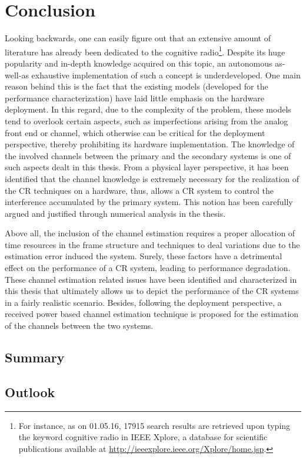 \chapter{Conclusion}
\label{chap:Con}

Looking backwards, one can easily figure out that an extensive amount of literature has already been dedicated to the cognitive radio\footnote{For instance, as on 01.05.16, 17915 search results are retrieved upon typing the keyword cognitive radio in IEEE Xplore, a database for scientific publications available at \url{http://ieeexplore.ieee.org/Xplore/home.jsp}.}. Despite its huge popularity and in-depth knowledge acquired on this topic, an autonomous as-well-as exhaustive implementation of such a concept is underdeveloped. One main reason behind this is the fact that the existing models (developed for the performance characterization) have laid little emphasis on the hardware deployment. In this regard, due to the complexity of the problem, these models tend to overlook certain aspects, such as imperfections arising from the analog front end or channel, which otherwise can be critical for the deployment perspective, thereby prohibiting its hardware implementation. The knowledge of the involved channels between the primary and the secondary systems is one of such aspects dealt in this thesis. 
From a physical layer perspective, it has been identified that the channel knowledge is extremely necessary for the realization of the CR techniques on a hardware, thus, allows a CR system to control the interference accumulated by the primary system. This notion has been carefully argued and justified through numerical analysis in the thesis. %

Above all, the inclusion of the channel estimation requires a proper allocation of time resources in the frame structure and techniques to deal variations due to the estimation error induced the system. Surely, these factors have a detrimental effect on the performance of a CR system, leading to performance degradation. These channel estimation related issues have been identified and characterized in this thesis that ultimately allows us to depict the performance of the CR systems in a fairly realistic scenario. Besides, following the deployment perspective, a received power based channel estimation technique is proposed for the estimation of the channels between the two systems.  


\section{Summary}




\section{Outlook}










